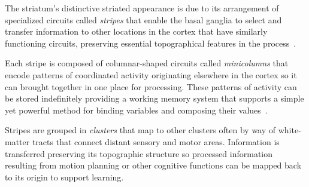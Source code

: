 The striatum's distinctive striated appearance is due to its arrangement of specialized circuits called {\it{stripes}} that enable the basal ganglia to select and transfer information to other locations in the cortex that have similarly functioning circuits, preserving essential topographical features in the process~\cite{BarbasandGarcia-CabezasCOiN-16,LewisetalJNC-02}.

Each stripe is composed of columnar-shaped circuits called {\it{minicolumns}} that encode patterns of coordinated activity originating elsewhere in the cortex so it can brought together in one place for processing. These patterns of activity can be stored indefinitely providing a working memory system that supports a simple yet powerful method for binding variables and composing their values~\cite{OReillyetalCCN-12}.

Stripes are grouped in {\it{clusters}} that map to other clusters often by way of white-matter tracts that connect distant sensory and motor areas. Information is transferred preserving its topographic structure so processed information resulting from motion planning or other cognitive functions can be mapped back to its origin to support learning.

